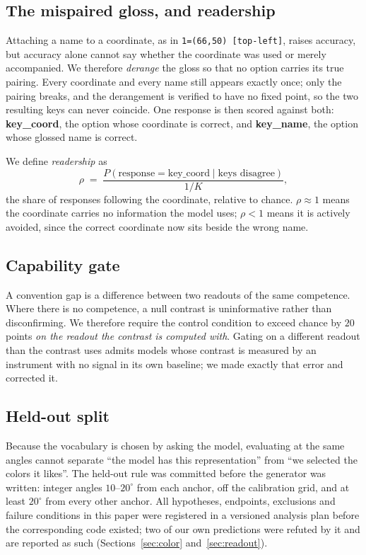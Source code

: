 \documentclass{article}
\newcommand{\readership}{\ensuremath{\rho}}
\begin{document}
\subsection{The mispaired gloss, and readership}
\label{sec:readership}

Attaching a name to a coordinate, as in \texttt{1=(66,50) [top-left]}, raises
accuracy, but accuracy alone cannot say whether the coordinate was used or merely
accompanied.
We therefore \emph{derange} the gloss so that no option carries its true pairing.
Every coordinate and every name still appears exactly once; only the pairing breaks,
and the derangement is verified to have no fixed point, so the two resulting keys
can never coincide. One response is then scored against both:
\textbf{key\_coord}, the option whose coordinate is correct, and \textbf{key\_name},
the option whose glossed name is correct.

We define \emph{readership} as
\begin{equation}
\readership \;=\; \frac{P(\text{response}=\text{key\_coord} \mid \text{keys disagree})}{1/K},
\end{equation}
the share of responses following the coordinate, relative to chance. $\readership
\approx 1$ means the coordinate carries no information the model uses; $\readership
< 1$ means it is actively avoided, since the correct coordinate now sits beside the
wrong name.

\subsection{Capability gate}

A convention gap is a difference between two readouts of the same competence. Where
there is no competence, a null contrast is uninformative rather than disconfirming.
We therefore require the control condition to exceed chance by $20$ points
\emph{on the readout the contrast is computed with}. Gating on a different readout
than the contrast uses admits models whose contrast is measured by an instrument
with no signal in its own baseline; we made exactly that error and corrected it.

\subsection{Held-out split}

Because the vocabulary is chosen by asking the model, evaluating at the same angles
cannot separate ``the model has this representation'' from ``we selected the colors
it likes''. The held-out rule was committed before the generator was written:
integer angles $10$--$20^\circ$ from each anchor, off the calibration grid, and at
least $20^\circ$ from every other anchor. All hypotheses, endpoints, exclusions and
failure conditions in this paper were registered in a versioned analysis plan before
the corresponding code existed; two of our own predictions were refuted by it and
are reported as such (Sections~\ref{sec:color} and~\ref{sec:readout}).
\end{document}
